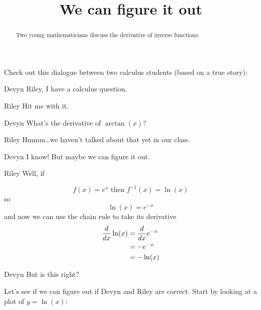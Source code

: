 \documentclass{ximera}
\title[Break-Ground:]{We can figure it out}
\begin{document}
\begin{abstract}
Two young mathematicians discuss the derivative of inverse functions.
\end{abstract}
\maketitle

Check out this dialogue between two calculus students (based on a true
story):

\begin{dialogue}
\item[Devyn] Riley, I have a calculus question.
\item[Riley] Hit me with it.
\item[Devyn] What's the derivative of $\arctan(x)$?
\item[Riley] Hmmm\dots we haven't talked about that yet in our class.
\item[Devyn] I know! But maybe we can figure it out.
\item[Riley] Well, if

\[ 
f(x)=e^{x} \text{ then } f^{-1}(x)=\ln (x) 
\]
so
\[
\ln(x) =  e^{-x} 
\]
  and now we can use the chain rule to take its derivative
  \begin{align*}
    \frac{d}{\mathop{}\!d x} \ln(x) &= \frac{d}{\mathop{}\!d x} e^{-x} \\
    &= -e^{-x}\\
    &= -\ln(x)\\
   \end{align*}
\item[Devyn] But is this right?
\end{dialogue}

Let's see if we can figure out if Devyn and Riley are correct. Start by looking at a plot of $y = \ln(x)$:

\begin{image}
\end{image}
\end{document}

